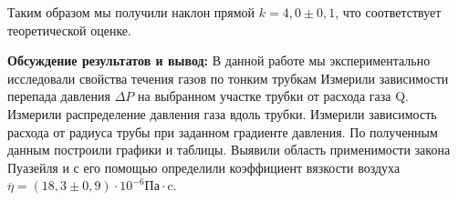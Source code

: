 \documentclass[a4paper, 12pt]{article}%
\begin{document}
\begin{enumerate}
	Таким образом мы получили наклон прямой $k=4,0\pm0,1$, что соответствует теоретической оценке.
	
	\textbf{Обсуждение результатов и вывод:}
	В данной работе мы экспериментально исследовали свойства течения газов по тонким трубкам	Измерили зависимости перепада давления $\Delta P$ на выбранном участке
	трубки от расхода газа Q. Измерили распределение давления газа вдоль трубки. Измерили зависимость расхода от радиуса трубы при заданном градиенте давления. По полученным данным построили графики и таблицы. Выявили область применимости закона Пуазейля и с его помощью определили коэффициент вязкости воздуха $\overline \eta = (18,3\pm 0,9)\cdot 10^{-6}  \text{Па} \cdot \text{c}$.

	
	
\end{enumerate}
\end{document}
